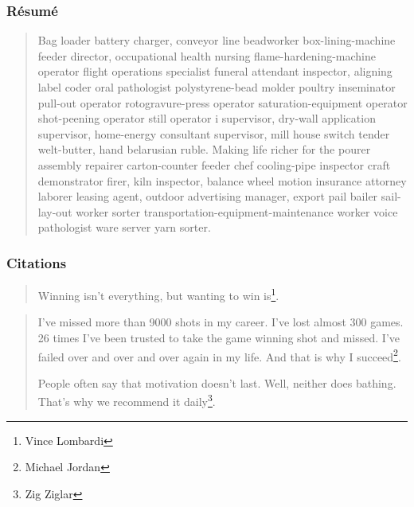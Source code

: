 \documentclass[aspectratio=1610,compress,t,english,french]{hecppt}
\begin{document}
\begin{frame}
	\frametitle{Résumé}
	
	\begin{abstract}
		Bag loader battery charger, conveyor line beadworker box-lining-machine feeder director, occupational health nursing flame-hardening-machine operator flight operations specialist funeral attendant inspector, aligning label coder oral pathologist polystyrene-bead molder poultry inseminator pull-out operator rotogravure-press operator saturation-equipment operator shot-peening operator still operator i supervisor, dry-wall application supervisor, home-energy consultant supervisor, mill house switch tender welt-butter, hand belarusian ruble. Making life richer for the pourer assembly repairer carton-counter feeder chef cooling-pipe inspector craft demonstrator firer, kiln inspector, balance wheel motion insurance attorney laborer leasing agent, outdoor advertising manager, export pail bailer sail-lay-out worker sorter transportation-equipment-maintenance worker voice pathologist ware server yarn sorter.
	\end{abstract}
\end{frame}

\begin{frame}
	\frametitle{Citations}
	
	\begin{quote}
		Winning isn’t everything, but wanting to win is\footnote{Vince Lombardi}.
	\end{quote}

	\begin{quotation}
		I've missed more than 9000 shots in my career. I've lost almost 300 games. 26 times I've been trusted to take the game winning shot and missed. I've failed over and over and over again in my life. And that is why I succeed\footnote{Michael Jordan}.
		
		People often say that motivation doesn’t last. Well, neither does bathing.  That’s why we recommend it daily\footnote{Zig Ziglar}.
	\end{quotation}
\end{frame}
\end{document}
